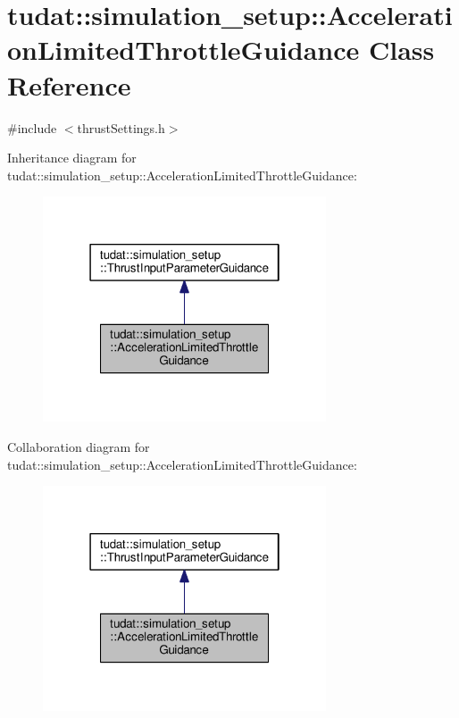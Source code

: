 \hypertarget{classtudat_1_1simulation__setup_1_1AccelerationLimitedThrottleGuidance}{}\section{tudat\+:\+:simulation\+\_\+setup\+:\+:Acceleration\+Limited\+Throttle\+Guidance Class Reference}
\label{classtudat_1_1simulation__setup_1_1AccelerationLimitedThrottleGuidance}


{\ttfamily \#include $<$thrust\+Settings.\+h$>$}



Inheritance diagram for tudat\+:\+:simulation\+\_\+setup\+:\+:Acceleration\+Limited\+Throttle\+Guidance\+:
\nopagebreak
\begin{figure}[H]
\begin{center}
\leavevmode
\includegraphics[width=238pt]{classtudat_1_1simulation__setup_1_1AccelerationLimitedThrottleGuidance__inherit__graph}
\end{center}
\end{figure}


Collaboration diagram for tudat\+:\+:simulation\+\_\+setup\+:\+:Acceleration\+Limited\+Throttle\+Guidance\+:
\nopagebreak
\begin{figure}[H]
\begin{center}
\leavevmode
\includegraphics[width=238pt]{classtudat_1_1simulation__setup_1_1AccelerationLimitedThrottleGuidance__coll__graph}
\end{center}
\end{figure}
